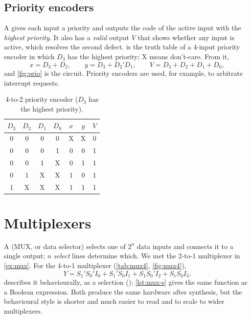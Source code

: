 
\subsection{Priority encoders}
A  gives each input a priority and outputs the code of the active input with the \emph{highest priority}. It also has a \emph{valid} output $V$ that shows whether any input is active, which resolves the second defect.  is the truth table of a 4-input priority encoder in which $D_3$ has the highest priority; X means don't-care. From it,
\[
 x = D_3 + D_2,\qquad y = D_3 + D_2'D_1,\qquad V = D_3+D_2+D_1+D_0 ,
\]
and \cref{fig:prio} is the circuit. Priority encoders are used, for example, to arbitrate interrupt requests.

\begin{table}[htbp]
\centering
\caption{4-to-2 priority encoder ($D_3$ has the highest priority).}
\label{tab:prio}
\begin{tabular}{cccc|ccc}
\toprule
$D_3$&$D_2$&$D_1$&$D_0$&$x$&$y$&$V$\\ \midrule
0&0&0&0&X&X&0\\0&0&0&1&0&0&1\\0&0&1&X&0&1&1\\0&1&X&X&1&0&1\\1&X&X&X&1&1&1\\ \bottomrule
\end{tabular}
\end{table}


\section{Multiplexers}\label{sec:mux}
A  (MUX, or data selector) selects one of $2^n$ data inputs and connects it to a single output; $n$ \emph{select} lines determine which. We met the 2-to-1 multiplexer in \cref{ex:mux}. For the 4-to-1 multiplexer (\cref{tab:mux4}, \cref{fig:mux4}),
\[
 Y = S_1'S_0'I_0 + S_1'S_0I_1 + S_1S_0'I_2 + S_1S_0I_3 .
\]
 describes it behaviourally, as a selection (); \cref{lst:mux-s} gives the same function as a Boolean expression. Both produce the same hardware after synthesis, but the behavioural style is shorter and much easier to read and to scale to wider multiplexers.

